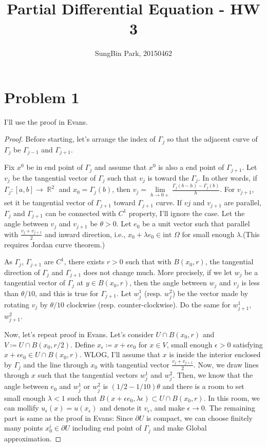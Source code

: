 \documentclass{article}
\DeclareMathOperator{\rr}{\mathbb{R}}
\begin{document}
\title{Partial Differential Equation - HW 3}
\author{SungBin Park, 20150462} 

 \maketitle

\section*{Problem 1}
I'll use the proof in Evans.
\begin{proof}
Before starting, let's arrange the index of $\Gamma_j$ so that the adjacent curve of $\Gamma_j$ be $\Gamma_{j-1}$ and $\Gamma_{j+1}$.

Fix $x^0$ be in end point of $\Gamma_j$ and assume that $x^0$ is also a end point of $\Gamma_{j+1}$. Let $v_{j}$ be the tangential vector of $\Gamma_j$ such that $v_j$ is toward the $\Gamma_j$. In other words, if $\Gamma_j:[a,b]\rightarrow \rr^2$ and $x_0=\Gamma_j(b)$, then $v_j=\lim\limits_{h\rightarrow 0+}\frac{\Gamma_j(b-h)-\Gamma_j(b)}{h}$. For $v_{j+1}$, set it be tangential vector of $\Gamma_{j+1}$ toward $\Gamma_{j+1}$ curve. If $v{j}$ and $v_{j+1}$ are parallel, $\Gamma_j$ and $\Gamma_{j+1}$ can be connected with $C^1$ property, I'll ignore the case. Let the angle between $v_j$ and $v_{j+1}$ be $\theta>0$. Let $e_0$ be a unit vector such that parallel with $\frac{v_j+v_{j+1}}{2}$ and inward direction, i.e., $x_0+\lambda e_0\in \text{int }\Omega$ for small enough $\lambda$.(This requires Jordan curve theorem.)

As $\Gamma_j$, $\Gamma_{j+1}$ are $C^1$, there exists $r>0$ such that with $B(x_0, r)$, the tangential direction of $\Gamma_j$ and $\Gamma_{j+1}$ does not change much. More precisely, if we let $w_j$ be a tangential vector of $\Gamma_j$ at $y\in B(x_0, r)$, then the angle between $w_j$ and $v_j$ is less than $\theta/10$, and this is true for $\Gamma_{j+1}$. Let $w^1_j$ (resp. $w^2_j$) be the vector made by rotating $v_j$ by $\theta/10$ clockwise (resp. counter-clockwise). Do the same for $w^1_{j+1}$, $w^2_{j+1}$.

Now, let's repeat proof in Evans. Let's consider $U\cap B(x_0, r)$ and $V\coloneqq U\cap B(x_0, r/2)$. Define $x_\epsilon\coloneqq x+\epsilon e_0$ for $x\in V$, small enough $\epsilon>0$ satisfying $x+\epsilon e_0\in U\cap B(x_0, r)$. WLOG, I'll assume that $x$ is inside the interior enclosed by $\Gamma_j$ and the line through $x_0$ with tangential vector $\frac{v_j+v_{j+1}}{2}$. Now, we draw lines through $x$ such that the tangential vectors $w^1_j$ and $w^2_j$. Then, we know that the angle between $e_0$ and $w^1_j$ or $w^2_j$ is $(1/2-1/10)\theta$ and there is a room to set small enough $\lambda<1$ such that $B(x+\epsilon e_0, \lambda \epsilon)\subset U\cap B(x_0, r)$. In this room, we can mollify $u_\epsilon(x)=u(x_\epsilon)$ and denote it $v_\epsilon$, and make $\epsilon\rightarrow 0$. The remaining part is same as the proof in Evans: Since $\partial U$ is compact, we can choose finitely many points $x_0^i\in \partial U$ including end point of $\Gamma_j$ and make Global approximation.
\end{proof}
\end{document}
